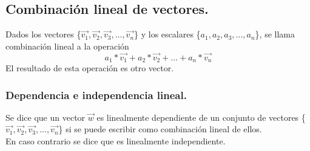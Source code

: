 \documentclass[a4paper,11pt,answers]{exam}
\begin{document}
\subsection{Combinación lineal de vectores.}
Dados los vectores \{$\vec{v_1}, \vec{v_2}, \vec{v_3},\dots,\vec{v_n}$\} y los escalares
\{$a_1, a_2, a_3, \dots, a_n$\}, se llama combinación lineal a la operación
\[a_1*\vec{v_1} + a_2*\vec{v_2}+\dots+a_n*\vec{v_n}\]
El resultado de esta operación es otro vector.

\subsubsection{Dependencia e independencia lineal.}
Se dice que un vector $\vec{w}$ es linealmente dependiente de un conjunto de vectores
\{$\vec{v_1}, \vec{v_2}, \vec{v_3},\dots,\vec{v_n}$\} si se puede escribir como combinación lineal
de ellos.\\

En caso contrario se dice que es linealmente independiente.\\
\end{document}
